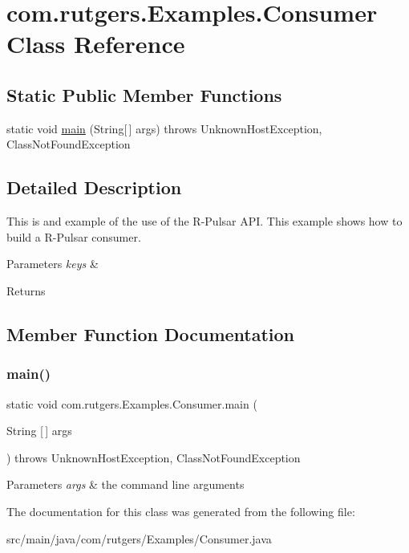 \hypertarget{classcom_1_1rutgers_1_1Examples_1_1Consumer}{}\section{com.\+rutgers.\+Examples.\+Consumer Class Reference}
\label{classcom_1_1rutgers_1_1Examples_1_1Consumer}
\subsection*{Static Public Member Functions}
\begin{DoxyCompactItemize}
\item 
static void \hyperlink{classcom_1_1rutgers_1_1Examples_1_1Consumer_a7b0c49c85b7cb8c93118d01ab990d025}{main} (String\mbox{[}$\,$\mbox{]} args)  throws Unknown\+Host\+Exception, Class\+Not\+Found\+Exception 
\end{DoxyCompactItemize}


\subsection{Detailed Description}
This is and example of the use of the R-\/\+Pulsar A\+PI. This example shows how to build a R-\/\+Pulsar consumer. 
\begin{DoxyParams}{Parameters}
{\em keys} & \\
\hline
\end{DoxyParams}
\begin{DoxyReturn}{Returns}

\end{DoxyReturn}


\subsection{Member Function Documentation}
\mbox{\label{classcom_1_1rutgers_1_1Examples_1_1Consumer_a7b0c49c85b7cb8c93118d01ab990d025}} 
\subsubsection{\texorpdfstring{main()}{main()}}
{\footnotesize\ttfamily static void com.\+rutgers.\+Examples.\+Consumer.\+main (\begin{DoxyParamCaption}\item[{String \mbox{[}$\,$\mbox{]}}]{args }\end{DoxyParamCaption}) throws Unknown\+Host\+Exception, Class\+Not\+Found\+Exception\hspace{0.3cm}{\ttfamily [static]}}


\begin{DoxyParams}{Parameters}
{\em args} & the command line arguments \\
\hline
\end{DoxyParams}


The documentation for this class was generated from the following file\+:\begin{DoxyCompactItemize}
\item 
src/main/java/com/rutgers/\+Examples/Consumer.\+java\end{DoxyCompactItemize}
